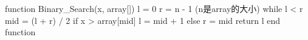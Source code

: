 \documentclass{article}
\begin{document}
\begin{algorithm}[caption={Binary Search}, label={alg1}]
function Binary_Search(x, array[])
    l = 0
    r = n - 1 (n是array的大小)
    while l < r
        mid = (l + r) / 2
        if x > array[mid]
            l = mid + 1
        else
            r = mid
    return l
end function
\end{algorithm}
\end{document}
